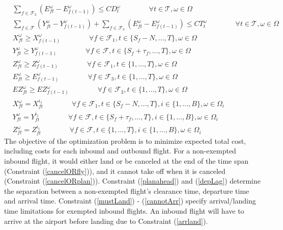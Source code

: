 \documentclass[12pt]{article}
\begin{document}
\begin{subequations}
\begin{align}
			& \sum_{f \in \mathcal{F}_3}\left(E_{ft}^\omega - E_{f(t-1)}^\omega\right) \leq CD_{t}^\omega \qquad \qquad \forall t \in \mathcal{T}, \omega \in \Omega \label{deptCap}\\
			& \sum_{f \in \mathcal{F}}\left(Y_{ft}^\omega - Y_{f(t-1)}^\omega\right) + \sum_{f \in \mathcal{F}_3}\left(E_{ft}^\omega - E_{f(t-1)}^\omega\right) \leq CT_t^\omega \qquad \qquad \forall t \in \mathcal{T}, \omega \in \Omega \label{totalCap}\\
			& X_{ft}^\omega \geq X_{f(t-1)}^\omega \qquad \qquad \forall f \in \mathcal{F}_1, t \in \{S_f - N, \dots, T\}, \omega \in \Omega \label{xupdate}\\
			& Y_{ft}^\omega \geq Y_{f(t-1)}^\omega \qquad \qquad \forall f \in \mathcal{F}, t \in \{S_f + \tau_f, \dots, T\}, \omega \in \Omega \label{yupdate}\\
			& Z_{ft}^\omega \geq Z_{f(t-1)}^\omega \qquad \qquad \forall f \in \mathcal{F}_1, t \in \{1, \dots, T\}, \omega \in \Omega \label{zupdate}\\
			& E_{ft}^\omega \geq E_{f(t-1)}^\omega \qquad \qquad \forall f \in \mathcal{F}_3, t \in \{1, \dots, T\}, \omega \in \Omega \label{eupdate}\\
			& EZ_{ft}^\omega \geq EZ_{f(t-1)}^\omega \qquad \qquad \forall f \in \mathcal{F}_3, t \in \{1, \dots, T\}, \omega \in \Omega \label{ezupdate}\\
			& X_{ft}^\omega = X_{ft}^{i_1} \qquad \qquad \forall f \in \mathcal{F}_1, t \in \{S_f - N, \dots, T\}, i \in \{1, \dots, B\}, \omega \in \Omega_i \label{nonAntX}\\
			& Y_{ft}^\omega = Y_{ft}^{i_1} \qquad \qquad \forall f \in \mathcal{F}, t \in \{S_f + \tau_f, \dots, T\}, i \in \{1, \dots, B\}, \omega \in \Omega_i \label{nonAntY}\\
			& Z_{ft}^\omega = Z_{ft}^{i_1} \qquad \qquad \forall f \in \mathcal{F}, t \in \{1, \dots, T\}, i \in \{1, \dots, B\}, \omega \in \Omega_i \label{nonAntZ}
		\end{align}
	\end{subequations}
	The objective of the optimization problem is to minimize expected total cost, including costs for each inbound and outbound flight. For a non-exempted inbound flight, it would either land or be canceled at the end of the time span (Constraint (\ref{cancelORfly})), and it cannot take off when it is canceled (Constraint (\ref{cancelORplan})). Constraint (\ref{planahead}) and (\ref{depLag}) determine the separation between a non-exempted flight's clearance time, departure time and arrival time. Constraint (\ref{mustLand}) - (\ref{cannotArr}) specify arrival/landing time limitations for exempted inbound flights. An inbound flight will have to arrive at the airport before landing due to Constraint (\ref{arrland}).\\
\end{document}
